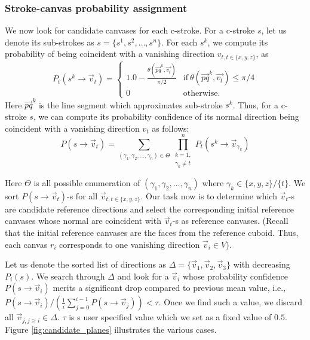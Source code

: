 {\subsubsection{Stroke-canvas probability assignment}

We now look for candidate canvases for each c-stroke. For a c-stroke $s$, let us denote its sub-strokes as $s = \{{s}^1,{s}^2,\dots, s^n\}$. For each ${s}^k$, we compute its probability of being coincident with a vanishing direction $v_{t,t \in \{x,y,z\}}$, as
\begin{equation}
P_t({s}^k \rightarrow \vec{v}_t) = \left\{ \begin{array}{ll}
1.0 - \frac{\theta(\vec{pq}^k, \vec{v_t})}{\pi/2} & \text{if} \ \theta(\vec{pq}^k, \vec{v_t}) \leq \pi/4\\
0 & \text{otherwise.}
\end{array} \right.
\end{equation}
Here ${\vec{pq}}^k$ is the line segment which approximates sub-stroke $s^k$. Thus, for a c-stroke $s$, we can compute its probability confidence of its normal direction being coincident with a vanishing direction $v_t$ as follows:
\begin{equation}
P({s} \rightarrow \vec{v}_t) = \sum_{(\gamma_1,\gamma_2,...,\gamma_n) \in \Theta}\prod_{\substack{k = 1, \\ \gamma_k \neq t}}^nP_t({s}^k \rightarrow \vec{v}_{\gamma_k})
\end{equation}

Here $\Theta$ is all possible enumeration of $(\gamma_1,\gamma_2,...,\gamma_n)$ where $\gamma_k \in \{x,y,z\}/\{t\}$. We sort $P({s} \rightarrow \vec{v}_t)$-s for all $\vec{v}_{t, t \in \{x,y,z\}}$. Our task now is to determine which $\vec{v}_t$-s are candidate reference directions and select the corresponding initial reference canvases whose normal are coincident with $\vec{v}_t$-s as reference canvases. (Recall that the initial reference canvases are the faces from the reference cuboid. Thus, each canvas $r_i$ corresponds to one vanishing direction $\vec{v}_i \in V$).

Let us denote the sorted list of directions as $\Delta = \{\vec{v}_{1},\vec{v}_{2},\vec{v}_{3}\}$ with decreasing $P_i(s)$. We search through $\Delta$ and look for a $\vec{v}_i$ whose probability confidence $P(s \rightarrow \vec{v}_i)$ merits a significant drop compared to previous mean value, i.e., $P(s\rightarrow \vec{v}_i)/(\frac{1}{i}\sum_{j=0}^{i-1}P(s \rightarrow \vec{v}_{j})) < \tau$. Once we find such a value, we discard all $\vec{v}_{j, j \geq i} \in \Delta$. $\tau$ is s user specified value which we set as a fixed value of $0.5$. Figure \ref{fig:candidate_planes} illustrates the various cases.

}
